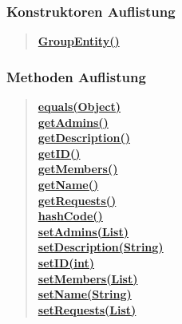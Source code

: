 \documentclass[11pt,a4paper]{article}
\begin{document}
{{{{\subsubsection{Konstruktoren Auflistung}{
\begin{verse}
\hyperlink{edu.kit.pse17.go_app.PersistenceLayer.GroupEntity()}{{\bf GroupEntity()}} \\
\end{verse}
}
\subsubsection{Methoden Auflistung}{
\begin{verse}
\hyperlink{edu.kit.pse17.go_app.PersistenceLayer.GroupEntity.equals(java.lang.Object)}{{\bf equals(Object)}} \\
\hyperlink{edu.kit.pse17.go_app.PersistenceLayer.GroupEntity.getAdmins()}{{\bf getAdmins()}} \\
\hyperlink{edu.kit.pse17.go_app.PersistenceLayer.GroupEntity.getDescription()}{{\bf getDescription()}} \\
\hyperlink{edu.kit.pse17.go_app.PersistenceLayer.GroupEntity.getID()}{{\bf getID()}} \\
\hyperlink{edu.kit.pse17.go_app.PersistenceLayer.GroupEntity.getMembers()}{{\bf getMembers()}} \\
\hyperlink{edu.kit.pse17.go_app.PersistenceLayer.GroupEntity.getName()}{{\bf getName()}} \\
\hyperlink{edu.kit.pse17.go_app.PersistenceLayer.GroupEntity.getRequests()}{{\bf getRequests()}} \\
\hyperlink{edu.kit.pse17.go_app.PersistenceLayer.GroupEntity.hashCode()}{{\bf hashCode()}} \\
\hyperlink{edu.kit.pse17.go_app.PersistenceLayer.GroupEntity.setAdmins(java.util.List)}{{\bf setAdmins(List)}} \\
\hyperlink{edu.kit.pse17.go_app.PersistenceLayer.GroupEntity.setDescription(java.lang.String)}{{\bf setDescription(String)}} \\
\hyperlink{edu.kit.pse17.go_app.PersistenceLayer.GroupEntity.setID(int)}{{\bf setID(int)}} \\
\hyperlink{edu.kit.pse17.go_app.PersistenceLayer.GroupEntity.setMembers(java.util.List)}{{\bf setMembers(List)}} \\
\hyperlink{edu.kit.pse17.go_app.PersistenceLayer.GroupEntity.setName(java.lang.String)}{{\bf setName(String)}} \\
\hyperlink{edu.kit.pse17.go_app.PersistenceLayer.GroupEntity.setRequests(java.util.List)}{{\bf setRequests(List)}} \\
\end{verse}
}
}}}}
\end{document}
